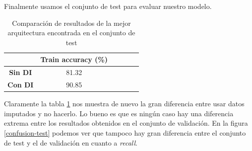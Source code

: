 \documentclass{article}
\begin{document}
Finalmente usamos el conjunto de test para evaluar nuestro modelo.
\begin{table}[!h]
				\begin{center}
					\begin{tabular}{ c | c | c | c | c | c |}
						\ & \textbf{Train accuracy (\%)}  \\ \hline
						\textbf{Sin DI} & 81.32 \\ \hline
						\textbf{Con DI} & 90.85 \\ \hline
					\end{tabular}
					\caption{Comparaci\'on de resultados de la mejor arquitectura encontrada en el conjunto de test}
					\label{tab:res-test}
				\end{center}
			\end{table}
Claramente la tabla \ref{tab:res-test} nos muestra de nuevo la gran diferencia entre usar datos imputados y no hacerlo. Lo bueno es que es ning\'un caso hay una diferencia extrema entre los resultados obtenidos en el conjunto de validaci\'on. En la figura \ref{confusion-test} podemos ver que tampoco hay gran diferencia entre el conjunto de test y el de validaci\'on en cuanto a \textit{recall}.\newpage
\end{document}
